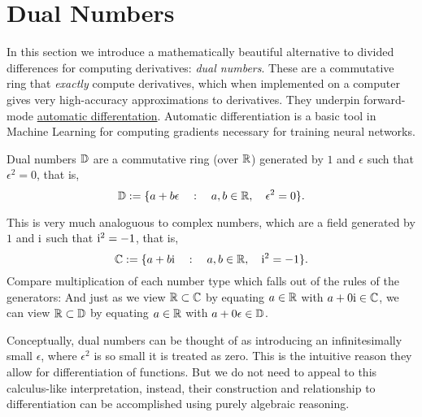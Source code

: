 
\section{Dual Numbers}
In this section we introduce a mathematically beautiful  alternative to divided differences for computing derivatives: \emph{dual numbers}. These are a commutative ring that \emph{exactly} compute derivatives, which when implemented on a computer gives very high-accuracy approximations to derivatives. They underpin forward-mode \href{https://en.wikipedia.org/wiki/Automatic_differentiation}{automatic differentation}. Automatic differentiation  is a basic tool in Machine Learning for computing gradients necessary for training neural networks.

\begin{definition} Dual numbers ${\mathbb D}$ are a commutative ring (over ${\mathbb R}$) generated by $1$ and $\ensuremath{\epsilon}$ such that $\ensuremath{\epsilon}^2 = 0$, that is,
\[
{\mathbb D} := \{a + b\epsilon \quad :\quad
 a,b \in {\mathbb R}, \quad \epsilon^2 =0 \}.
\]
\end{definition}

This is very much analoguous to complex numbers, which are a field generated by $1$ and ${\rm i}$ such that ${\rm i}^2 = -1$, that is,
\[
{\mathbb C} := \{a + b{\rm i} \quad :\quad
 a,b \in {\mathbb R}, \quad {\rm i}^2 =-1 \}.
\]
Compare multiplication of each number type which falls out of the rules of the generators:
And just as we view ${\mathbb R} \subset {\mathbb C}$ by equating $a \in {\mathbb R}$ with $a + 0{\rm i} \in {\mathbb C}$, we can view ${\mathbb R} \subset {\mathbb D}$ by equating $a \in {\mathbb R}$ with $a + 0{\rm \epsilon} \in {\mathbb D}$.

Conceptually, dual numbers can be thought of as introducing an infinitesimally small $\ensuremath{\epsilon}$, where $\ensuremath{\epsilon}^2$ is so small it is treated as zero. This is the intuitive reason they allow for differentiation of functions. But we do not need to appeal to this calculus-like interpretation, instead, their construction and relationship to differentiation can be accomplished using purely algebraic reasoning.

